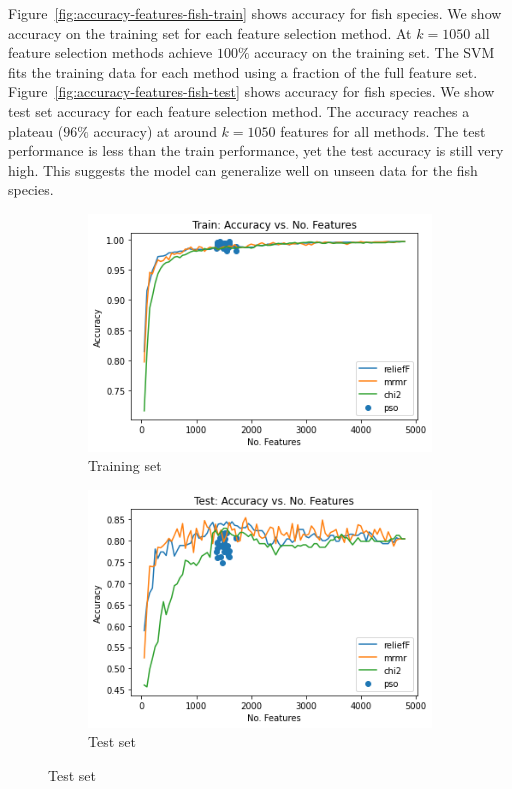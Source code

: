 \documentclass{article}
\begin{document}
Figure~\ref{fig:accuracy-features-fish-train} shows accuracy for fish species.
We show accuracy on the training set for each feature selection method.
At $k=1050$ all feature selection methods achieve $100\%$ accuracy on the training set.
The SVM fits the training data for each method using a fraction of the full feature set.
Figure~\ref{fig:accuracy-features-fish-test} shows accuracy for fish species.
We show test set accuracy for each feature selection method.
The accuracy reaches a plateau ($96\%$ accuracy) at around $k=1050$ features for all methods.
The test performance is less than the train performance, yet the test accuracy is still very high.
This suggests the model can generalize well on unseen data for the fish species.

\begin{figure}[htb]
  \centering
  \begin{subfigure}[b]{\linewidth}
    \includegraphics[width=1\linewidth]{accuracy-features-part-train.png}
    \caption{Training set}
    \label{fig:accuracy-features-part-train}
  \end{subfigure}

  \begin{subfigure}[b]{\linewidth}
    \includegraphics[width=1\linewidth]{accuracy-features-part-test.png}
    \caption{Test set}
    \label{fig:accuracy-features-part-test}
  \end{subfigure}


\end{figure}
\end{document}
